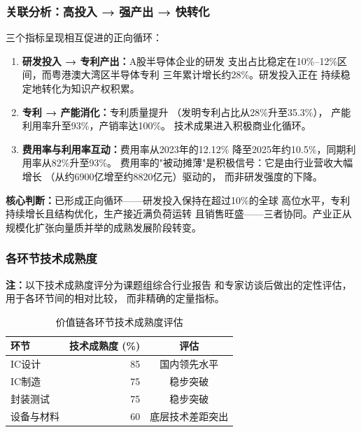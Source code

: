\documentclass[12pt,a4paper]{article}
\newcommand{\tableHeaderRow}{\rowcolor{tealPrimary}\color{white}}
\newcommand{\tableOddRow}{\rowcolor{mintBG}}
\newcommand{\tableEvenRow}{\rowcolor{white}}
\begin{document}
\subsubsection{关联分析：高投入 → 强产出 → 快转化}

三个指标呈现相互促进的正向循环：

\begin{enumerate}[label=(\arabic*)]
    \item \textbf{研发投入 → 专利产出：}A股半导体企业的研发
          支出占比稳定在10\%--12\%区间，而粤港澳大湾区半导体专利
          三年累计增长约28\%。研发投入正在
          持续稳定地转化为知识产权积累。
    \item \textbf{专利 → 产能消化：}专利质量提升
          （发明专利占比从28\%升至35.3\%），
          产能利用率升至93\%，产销率达100\%。
          技术成果进入积极商业化循环。
    \item \textbf{费用率与利用率互动：}费用率从2023年的12.12\%
          降至2025年约10.5\%，同期利用率从82\%升至93\%。
          费用率的"被动摊薄"是积极信号：它是由行业营收大幅增长
          （从约6900亿增至约8820亿元）驱动的，
          而非研发强度的下降。
\end{enumerate}

\textbf{核心判断：}已形成正向循环——研发投入保持在超过10\%的全球
高位水平，专利持续增长且结构优化，生产接近满负荷运转
且销售旺盛——三者协同。产业正从
规模化扩张向量质并举的成熟发展阶段转变。

\subsubsection{各环节技术成熟度}

{\footnotesize\textbf{注：}以下技术成熟度评分为课题组综合行业报告
和专家访谈后做出的定性评估，用于各环节间的相对比较，
而非精确的定量指标。}

\begin{table}[H]
\centering
\caption{价值链各环节技术成熟度评估}
\label{tab:tech_maturity}
\begin{tabular}{lrc}
\toprule
\tableHeaderRow
\textbf{环节} & \textbf{技术成熟度 (\%)} & \textbf{评估} \\
\midrule
\tableOddRow  IC设计      & 85 & 国内领先水平 \\
\tableEvenRow IC制造      & 75 & 稳步突破 \\
\tableOddRow  封装测试    & 75 & 稳步突破 \\
\tableEvenRow 设备与材料  & 60 & 底层技术差距突出 \\
\bottomrule
\end{tabular}
\end{table}
\end{document}

